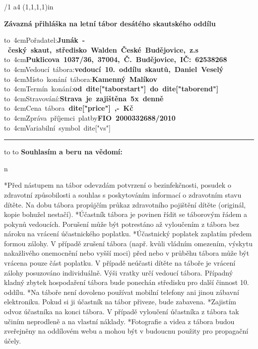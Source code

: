 
\typosize[11/13]
\margins/1 a4 (1,1,1,1)in
\chyph
\fontfam[timesroman]
\nopagenumbers

\centerline{
\typosize[20/13]
\bf
Závazná přihláška na letní tábor desátého skautského oddílu
}
\vskip 1cm
\hbox{\hbox to 4cm{Pořadatel:\hfil}\bf Junák - český skaut, středisko Walden České Budějovice, z.s}
\hbox{\hbox to 4cm{\hfil}\bf Puklicova 1037/36, 37004, Č. Budějovice, IČ: 62538268}
\hbox{\hbox to 4cm{Vedoucí tábora:\hfil}\bf vedoucí 10. oddílu skautů, Daniel Veselý}
\hbox{\hbox to 4cm{Místo konání tábora:\hfil}\bf Kamenný Malíkov}
\hbox{\hbox to 4cm{Termín konání:\hfil}\bf od {{dite["taborstart"]}} do {{dite["taborend"]}}}
\hbox{\hbox to 4cm{Stravování:\hfil}\bf Strava je zajištěna 5x denně}
\hbox{\hbox to 4cm{Cena tábora\hfil}\bf {{ dite["price"] }},- Kč}
\hbox{\hbox to 4cm{Zpráva příjemci platby\hfil}\bf FIO 2000332688/2010}
\hbox{\hbox to 4cm{Variabilní symbol\hfil}{{ dite["vs"] }}}

\bigskip
\hrule
\bigskip

{
\typosize[11/18]
\hbox to 
\hbox to 
}
\smallskip
\noindent
{\bf Souhlasím a beru na vědomí:}
{
\begitems \style n
\leftskip=1cm
\rightskip=0cm
\parskip=5pt
\par
*Před nástupem na tábor odevzdám potvrzení o bezinfekčnosti, posudek o zdravotní způsobilosti a souhlas s poskytováním informací o zdravotním stavu dítěte. 
Na dobu tábora propůjčím průkaz zdravotního pojištění dítěte (originál, kopie bohužel nestačí).
*Účastník tábora je povinen řídit se táborovým řádem a
pokynů vedoucích. Porušení může být potrestáno až
vyloučením z tábora bez nároku na vrácení účastnického
poplatku.
*Účastnický poplatek zaplatím předem formou zálohy. V
případě zrušení tábora (např. kvůli vládním omezením,
výskytu nakažlivého onemocnění nebo vyšší moci) před nebo
v průběhu tábora může být vrácena pouze část poplatku. V
případě neúčasti dítěte na táboře je vrácení zálohy posuzováno individuálně. Výši vratky určí vedoucí tábora.
Případný kladný zbytek hospodaření tábora bude ponechán středisku pro další činnost 10. oddílu.
*Na táboře není dovoleno používat mobilní telefony ani 
jinou zábavní elektroniku. Pokud si ji účastník na tábor 
přiveze, bude zabavena.
*Zajistím odvoz účastníka na konci tábora. V případě 
vyloučení účastníka z tábora tak učiním neprodleně a na 
vlastní náklady.
*Fotografie a videa z tábora budou zveřejněny na oddílovém 
webu a mohou být v budoucnu použity pro propagační účely.
\enditems
}


